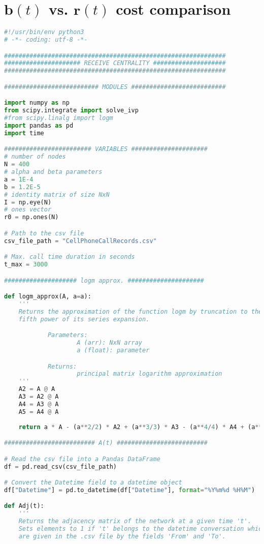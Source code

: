 \section*{$\mathbf{b}(t)$ vs. $\mathbf{r}(t)$ cost comparison}
\label{sec:brc}
\begin{lstlisting}[language=Python, caption=Broadcast - Receive centrality comparison]
#!/usr/bin/env python3
# -*- coding: utf-8 -*-

#############################################################
##################### RECEIVE CENTRALITY ####################
#############################################################

########################## MODULES ##########################

import numpy as np
from scipy.integrate import solve_ivp
#from scipy.linalg import logm
import pandas as pd
import time

######################## VARIABLES #####################
# number of nodes
N = 400 
# alpha and beta parameters
a = 1E-4
b = 1.2E-5
# identity matrix of size NxN
I = np.eye(N)
# ones vector
r0 = np.ones(N)

# Path to the csv file
csv_file_path = "CellPhoneCallRecords.csv"

# Max. call time duration in seconds
t_max = 3000

#################### logm approx. #####################

def logm_approx(A, a=a):
    '''
    Returns the approximation of the function logm by truncation to the 
    fifth power of its series expansion.

            Parameters:
                    A (arr): NxN array 
                    a (float): parameter

            Returns:
                    principal matrix logarithm approximation 
    '''
    A2 = A @ A
    A3 = A2 @ A
    A4 = A3 @ A
    A5 = A4 @ A
    
    return a * A - (a**2/2) * A2 + (a**3/3) * A3 - (a**4/4) * A4 + (a**5/5) * A5

######################### A(t) #########################

# Read the csv file into a Pandas DataFrame
df = pd.read_csv(csv_file_path)

# Convert the Datetime field to a datetime object
df["Datetime"] = pd.to_datetime(df["Datetime"], format="%Y%m%d %H%M")

def Adj(t):
    '''
    Returns the adjacency matrix of the network at a given time 't'. 
    Sets elements to 1 if 't' belongs to the datetime conversation which nodes
    are given in the .csv file by the fields 'From' and 'To'.


\end{lstlisting}
